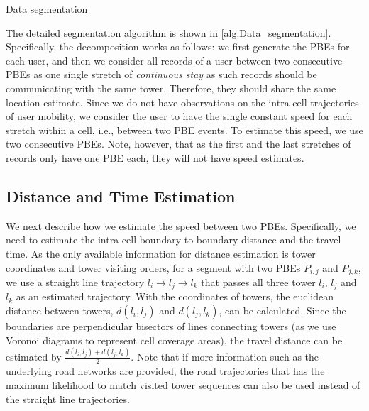 \begin{algorithm}
 \caption{Data segmentation}\label{alg:Data_segmentation}
\end{algorithm}

The detailed segmentation algorithm is shown in \autoref{alg:Data_segmentation}. Specifically, the decomposition works as follows: we first generate the PBEs for each user, and then we consider all records of a user between two consecutive PBEs as one single stretch of \emph{continuous stay} as such records should be communicating with the same tower. Therefore, they should share the same location estimate. Since we do not have observations on the intra-cell trajectories of user mobility, we consider the user to have the single constant speed for each stretch within a cell, i.e., between two PBE events. To estimate this speed, we use two consecutive PBEs. 
Note, however, that as the first and the last stretches of records only have one PBE each, they will not have speed estimates.

\subsection{Distance and Time Estimation}

We next describe how we estimate the speed between two PBEs. Specifically, we need to estimate the intra-cell boundary-to-boundary distance and the travel time. As the only available information for distance estimation is tower coordinates and tower visiting orders, for a segment with two PBEs $P_{i,j}$ and $P_{j,k}$, we use a straight line trajectory $l_i \rightarrow l_j \rightarrow l_k$ that passes all three tower $l_i$, $l_j$ and $l_k$ as an estimated trajectory. With the coordinates of towers, the euclidean distance between towers, $d(l_i,l_j)$ and $d(l_j,l_k)$, can be calculated. Since the boundaries are perpendicular bisectors of lines connecting towers (as we use Voronoi diagrams to represent cell coverage areas), the travel distance can be estimated by $\frac{d(l_i,l_j) + d(l_j,l_k)}{2}$. Note that if more information such as the underlying road networks are provided, the road trajectories that has the maximum likelihood to match visited tower sequences can also be used instead of the straight line trajectories.

